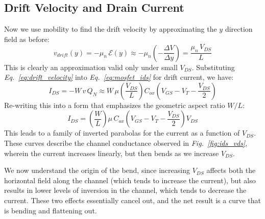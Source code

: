 \subsection{Drift Velocity and Drain Current}
Now we use mobility to find the drift velocity by approximating the $y$ direction field as before:
    \begin{equation}
        v_{drift}(y) =  -\mu_n\,\mathcal{E}(y) \approx -\mu_n \left( -\frac{\Delta V}{\Delta y} \right) = \frac{\mu_n\,V_{DS}}{L}
        \label{eq:drift_velocity}
    \end{equation}
This is clearly an approximation valid only under small $V_{DS}$.  Substituting \emph{Eq.~\ref{eq:drift_velocity}} into \emph{Eq.~\ref{eq:mosfet_ids}} for drift current, we have:
    \begin{equation}
        I_{DS} = -W\,v\,Q_N \approx W\,\mu \left( \frac{V_{DS}}{L} \right) C_{ox} \left( V_{GS} - V_T - \frac{V_{DS}}{2} \right)
    \end{equation}
Re-writing this into a form that emphasizes the geometric aspect ratio $W/L$:
    \begin{equation}
        I_{DS} = \left( \frac{W}{L} \right) \mu\,C_{ox} \left( V_{GS} - V_T - \frac{V_{DS}}{2} \right)V_{DS}
    \end{equation}
This leads to a family of inverted parabolas for the current as a function of $V_{DS}$.  These curves describe the channel conductance observed in \emph{Fig.~\ref{fig:ids_vds}}, wherein the current increases linearly, but then bends as we increase $V_{DS}$.

We now understand the origin of the bend, since increasing $V_{DS}$ affects both the horizontal field along the channel (which tends to increase the current), but also results in lower levels of inversion in the channel, which tends to decrease the current.  These two effects essentially cancel out, and the net result is a curve that is bending and flattening out.
